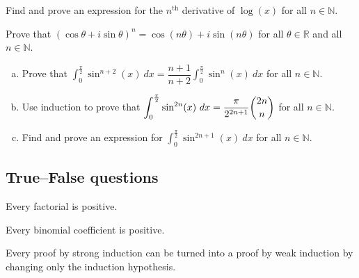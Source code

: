 \begin{chapex}
Find and prove an expression for the $n^{\text{th}}$ derivative of $\log(x)$ for all $n \in \mathbb{N}$.
\end{chapex}

\begin{chapex}
Prove that $(\cos \theta + i \sin \theta)^n = \cos (n\theta) + i \sin (n\theta)$ for all $\theta \in \mathbb{R}$ and all $n \in \mathbb{N}$.
\end{chapex}

\begin{chapex}
\label{cqCalculusEnd}
\begin{enumerate}[(a)]
\item Prove that $\displaystyle \int_0^{\frac{\pi}{2}} \sin^{n+2}(x)~dx = \dfrac{n+1}{n+2} \int_0^{\frac{\pi}{2}} \sin^n(x)~dx$ for all $n \in \mathbb{N}$.
\item Use induction to prove that $\displaystyle \int_0^{\frac{\pi}{2}} \sin^{2n}(x)~dx = \dfrac{\pi}{2^{2n+1}} \dbinom{2n}{n}$ for all $n \in \mathbb{N}$.
\item Find and prove an expression for $\displaystyle \int_0^{\frac{\pi}{2}} \sin^{2n+1}(x)~dx$ for all $n \in \mathbb{N}$.
\end{enumerate}
\end{chapex}

\subsection*{True--False questions}


\begin{chapex} %
\label{cqInductionTFBegin}
Every factorial is positive.
\end{chapex}

\begin{chapex} %
Every binomial coefficient is positive.
\end{chapex}

\begin{chapex} %
Every proof by strong induction can be turned into a proof by weak induction by changing only the induction hypothesis.
\end{chapex}

